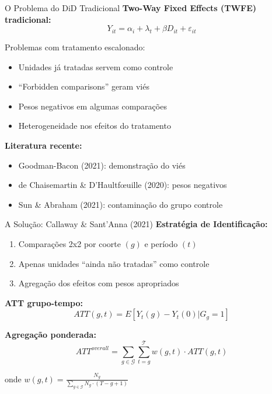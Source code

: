 \documentclass[10pt,aspectratio=169]{beamer}
\begin{document}
\begin{frame}{O Problema do DiD Tradicional}
\textbf{Two-Way Fixed Effects (TWFE) tradicional:}
\begin{equation}
Y_{it} = \alpha_i + \lambda_t + \beta D_{it} + \varepsilon_{it}
\end{equation}

\begin{alertblock}{Problemas com tratamento escalonado:}
\begin{itemize}
    \item Unidades já tratadas servem como controle
    \item ``Forbidden comparisons'' geram viés
    \item Pesos negativos em algumas comparações
    \item Heterogeneidade nos efeitos do tratamento
\end{itemize}
\end{alertblock}

\textbf{Literatura recente:}
\begin{itemize}
    \item Goodman-Bacon (2021): demonstração do viés
    \item de Chaisemartin & D'Haultfœuille (2020): pesos negativos
    \item Sun & Abraham (2021): contaminação do grupo controle
\end{itemize}
\end{frame}

\begin{frame}{A Solução: Callaway \& Sant'Anna (2021)}
\textbf{Estratégia de Identificação:}
\begin{enumerate}
    \item Comparações 2x2 por coorte $(g)$ e período $(t)$
    \item Apenas unidades ``ainda não tratadas'' como controle
    \item Agregação dos efeitos com pesos apropriados
\end{enumerate}

\textbf{ATT grupo-tempo:}
\begin{equation}
ATT(g,t) = E[Y_t(g) - Y_t(0) | G_g = 1]
\end{equation}

\textbf{Agregação ponderada:}
\begin{equation}
ATT^{overall} = \sum_{g \in \mathcal{G}} \sum_{t=g}^{\mathcal{T}} w(g,t) \cdot ATT(g,t)
\end{equation}

onde $w(g,t) = \frac{N_g}{\sum_{g \in \mathcal{G}} N_g \cdot (T - g + 1)}$
\end{frame}
\end{document}

